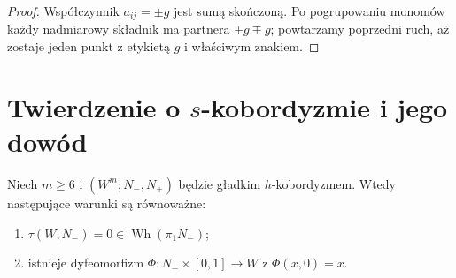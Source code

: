 \begin{proof}
Współczynnik $a_{ij}=\pm g$ jest sumą skończoną.
Po pogrupowaniu monomów każdy nadmiarowy
składnik ma partnera $\pm g\mp g$; powtarzamy
poprzedni ruch, aż zostaje jeden punkt
z etykietą $g$ i właściwym znakiem.
\end{proof}

\section{Twierdzenie o \texorpdfstring{$s$}{s}-kobordyzmie i jego dowód}
\label{sec:tw-s-kobordyzm-20}

\begin{samepage}
\begin{twierdzenie}
\label{thm:s-kobordyzm-20}
Niech $m\geq6$ i $(W^m;N_-,N_+)$ będzie gładkim
$h$-kobordyzmem. Wtedy następujące warunki są równoważne:
\begin{enumerate}[label=(\roman*)]
 \item $\tau(W,N_-)=0\in\operatorname{Wh}(\pi_1N_-)$;
 \item istnieje dyfeomorfizm
 $\Phi:N_-\times[0,1]\to W$ z $\Phi(x,0)=x$.
\end{enumerate}
\end{twierdzenie}
\end{samepage}

